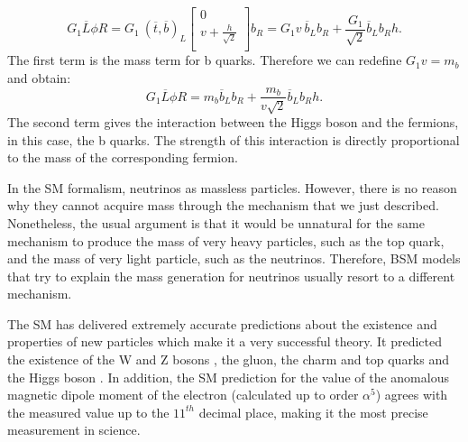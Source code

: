 \begin{equation}
	G_1 \overline{L}\phi R = G_1 ~(\overline{t}, \overline{b})_L \begin{bmatrix}
	0 \\
	v+\frac{h}{\sqrt{2}} \\
	\end{bmatrix} b_R = G_1 v ~\overline{b}_L b_R + \frac{G_1}{\sqrt{2}} \overline{b}_L b_R h.
\end{equation}
The first term is the mass term for b quarks. Therefore we can redefine $G_1 v = m_b$ and obtain:
\begin{equation}
	G_1 \overline{L}\phi R=m_b \overline{b}_L b_R + \frac{m_b}{v\sqrt{2}} \overline{b}_L b_R h.
\end{equation}
The second term gives the interaction between the Higgs boson and the fermions, in this case, the b quarks. The strength of this interaction is directly proportional to the mass of the corresponding fermion.

In the SM formalism, neutrinos as massless particles. However, there is no reason why they cannot acquire mass through the mechanism that we just described. Nonetheless, the usual argument is that it would be unnatural for the same mechanism to produce the mass of very heavy particles, such as the top quark, and the mass of very light particle, such as the neutrinos. Therefore, BSM models that try to explain the mass generation for neutrinos usually resort to a different mechanism.


The SM has delivered extremely accurate predictions about the existence and properties of new particles which make it a very successful theory. It predicted the existence of the W and Z bosons \cite{Glashow-Weinberg-Salam}, the gluon, the charm and top quarks and the Higgs boson \cite{Higgs,EnglertBrout,Guralnik}. In addition, the SM prediction for the value of the anomalous magnetic dipole moment of the electron (calculated up to order $\alpha^5$) agrees with the measured value up to the $11^{th}$ decimal place, making it the most precise measurement in science.

